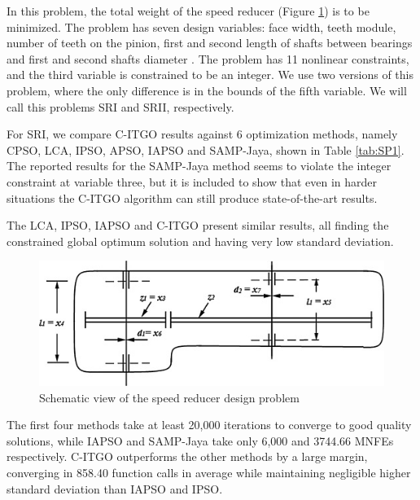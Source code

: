 In this problem, the total weight of the speed reducer (Figure \ref{fig:SR}) is to be minimized. The problem has seven design variables: face width, teeth module, number of teeth on the pinion, first and second length of shafts between bearings and first and second shafts diameter \citep{SR}. The problem has 11 nonlinear constraints, and the third variable is constrained to be an integer. We use two versions of this problem, where the only difference is in the bounds of the fifth variable. We will call this problems SRI and SRII, respectively.


For SRI, we compare C-ITGO results against 6 optimization methods, namely CPSO, LCA, IPSO, APSO, IAPSO and SAMP-Jaya, shown in Table \ref{tab:SP1}. The reported results for the SAMP-Jaya method seems to violate the integer constraint at variable three, but it is included to show that even in harder situations the C-ITGO algorithm can still produce state-of-the-art results.

The LCA, IPSO, IAPSO and C-ITGO present similar results, all finding the constrained global optimum solution and having very low standard deviation.

\begin{figure}[h]
    \begin{center}
    \includegraphics[scale=0.6]{Imgs/SR.jpg}
    \end{center}
    \captionsetup{justification=centering}
    \caption{Schematic view of the speed reducer design problem}\label{fig:SR}
\end{figure}




The first four methods take at least 20,000 iterations to converge to good quality solutions, while IAPSO and SAMP-Jaya take only 6,000 and 3744.66 MNFEs respectively. C-ITGO outperforms the other methods by a large margin, converging in 858.40 function calls in average while maintaining negligible higher standard deviation than IAPSO and IPSO.

